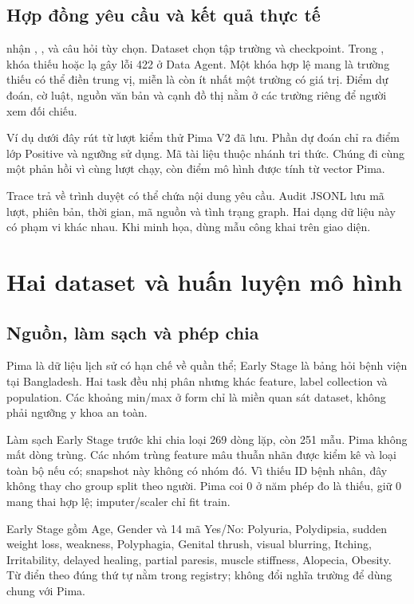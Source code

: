 \section{Hợp đồng yêu cầu và kết quả thực tế}
 nhận , ,  và câu hỏi tùy chọn. Dataset chọn tập trường và checkpoint. Trong , khóa thiếu hoặc lạ gây lỗi 422 ở Data Agent. Một khóa hợp lệ mang  là trường thiếu có thể điền trung vị, miễn là còn ít nhất một trường có giá trị. Điểm dự đoán, cờ luật, nguồn văn bản và cạnh đồ thị nằm ở các trường riêng để người xem đối chiếu.

Ví dụ dưới đây rút từ lượt kiểm thử Pima V2 đã lưu. Phần dự đoán chỉ ra điểm lớp Positive và ngưỡng sử dụng. Mã tài liệu  thuộc nhánh tri thức. Chúng đi cùng một phản hồi vì cùng lượt chạy, còn điểm mô hình được tính từ vector Pima.


Trace trả về trình duyệt có thể chứa nội dung yêu cầu. Audit JSONL lưu mã lượt, phiên bản, thời gian, mã nguồn và tình trạng graph. Hai dạng dữ liệu này có phạm vi khác nhau. Khi minh họa, dùng mẫu công khai trên giao diện.

\chapter{Hai dataset và huấn luyện mô hình}\label{pr:model}
\section{Nguồn, làm sạch và phép chia}

Pima là dữ liệu lịch sử có hạn chế về quần thể; Early Stage là bảng hỏi bệnh viện tại Bangladesh. Hai task đều nhị phân nhưng khác feature, label collection và population. Các khoảng min/max ở form chỉ là miền quan sát dataset, không phải ngưỡng y khoa an toàn.

Làm sạch Early Stage trước khi chia loại 269 dòng lặp, còn 251 mẫu. Pima không mất dòng trùng. Các nhóm trùng feature mâu thuẫn nhãn được kiểm kê và loại toàn bộ nếu có; snapshot này không có nhóm đó. Vì thiếu ID bệnh nhân, đây không thay cho group split theo người. Pima coi 0 ở năm phép đo là thiếu, giữ 0 mang thai hợp lệ; imputer/scaler chỉ fit train.

Early Stage gồm Age, Gender và 14 mã Yes/No: Polyuria, Polydipsia, sudden weight loss, weakness, Polyphagia, Genital thrush, visual blurring, Itching, Irritability, delayed healing, partial paresis, muscle stiffness, Alopecia, Obesity. Từ điển theo đúng thứ tự nằm trong registry; không đổi nghĩa trường để dùng chung với Pima.

